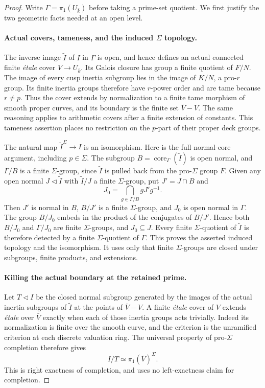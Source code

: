 \begin{proof}
Write $\Gamma=\pi_1(U_{\bar k})$ before taking a prime-set quotient.
We first justify the two geometric facts needed at an open level.

\paragraph{Actual covers, tameness, and the induced $\Sigma$ topology.}
The inverse image $\widetilde I$ of $I$ in $\Gamma$ is open,
and hence defines an actual connected finite \emph{\'etale} cover
$V\to U_{\bar k}$. Its Galois closure has group a finite quotient
of $F/N$. The image of every cusp inertia subgroup lies in the
image of $K/N$, a pro-$r$ group. Its finite inertia groups
therefore have $r$-power order and are tame because $r\ne p$.
Thus the cover extends by normalization to a finite tame morphism
of smooth proper curves, and its boundary is the finite set
$\bar V-V$. The same reasoning applies to arithmetic covers after
a finite extension of constants. This tameness assertion places
no restriction on the $p$-part of their proper deck groups.

The natural map $\widetilde I^\Sigma\to I$ is an isomorphism.
Here is the full normal-core argument, including $p\in\Sigma$.
The subgroup $B=\operatorname{core}_{\Gamma}(\widetilde I)$ is
open normal, and $\Gamma/B$ is a finite $\Sigma$-group, since
$\widetilde I$ is pulled back from the pro-$\Sigma$ group $F$.
Given any open normal $J\triangleleft\widetilde I$ with
$\widetilde I/J$ a finite $\Sigma$-group, put $J'=J\cap B$ and
\[
                 J_0=\bigcap_{g\in\Gamma/B}gJ'g^{-1}.
\]
Then $J'$ is normal in $B$, $B/J'$ is a finite $\Sigma$-group,
and $J_0$ is open normal in $\Gamma$. The group $B/J_0$ embeds
in the product of the conjugates of $B/J'$. Hence both $B/J_0$
and $\Gamma/J_0$ are finite $\Sigma$-groups, and $J_0\subseteq J$.
Every finite $\Sigma$-quotient of $\widetilde I$ is therefore
detected by a finite $\Sigma$-quotient of $\Gamma$. This proves
the asserted induced topology and the isomorphism. It uses only
that finite $\Sigma$-groups are closed under subgroups, finite
products, and extensions.

\paragraph{Killing the actual boundary at the retained prime.}
Let $T\triangleleft I$ be the closed normal subgroup generated by
the images of the actual inertia subgroups of $\widetilde I$ at
the points of $\bar V-V$. A finite \emph{\'etale} cover of $V$
extends \emph{\'etale} over $\bar V$ exactly when each of those
inertia groups acts trivially. Indeed its normalization is finite
over the smooth curve, and the criterion is the unramified
criterion at each discrete valuation ring. The universal property
of pro-$\Sigma$ completion therefore gives
\[
                       I/T\simeq\pi_1(\bar V)^\Sigma.
\]
This is right exactness of completion, and uses no left-exactness
claim for completion.


\end{proof}
